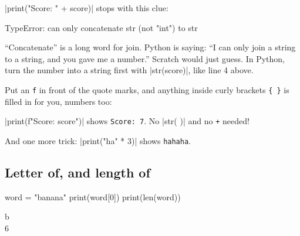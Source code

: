 \begin{watchout}
\py|print("Score: " + score)| stops with this clue:
\begin{errorbox}
TypeError: can only concatenate str (not "int") to str
\end{errorbox}
``Concatenate'' is a long word for join. Python is saying: ``I can only join a string to a string, and you gave me a number.'' Scratch would just guess. In Python, turn the number into a string first with \py|str(score)|, like line 4 above.
\end{watchout}

\begin{think}
Put an \texttt{f} in front of the quote marks, and anything inside curly brackets \texttt{\{ \}} is filled in for you, numbers too:\par
\py|print(f"Score: {score}")| shows \texttt{Score: 7}. No \py|str( )| and no \texttt{+} needed!

And one more trick: \py|print("ha" * 3)| shows \texttt{hahaha}.
\end{think}

\subsection*{Letter of, and length of}

\begin{tcbraster}[raster columns=2, raster equal height=rows, raster column skip=12pt, raster valign=center, raster force size=false, raster odd column/.style={add to width=-1.2cm}, raster even column/.style={add to width=1.2cm}]
\begin{tcolorbox}[colback=white, colframe=white, boxrule=0pt, valign=center]
\begin{scratch}
\end{scratch}
\end{tcolorbox}
\begin{tcolorbox}[colback=white, colframe=white, boxrule=0pt, left=0pt, right=0pt, top=0pt, bottom=0pt, valign=center]
\begin{code}
word = "banana"
print(word[0])
print(len(word))
\end{code}
\begin{outputbox}
b\\
6
\end{outputbox}
\end{tcolorbox}
\end{tcbraster}

